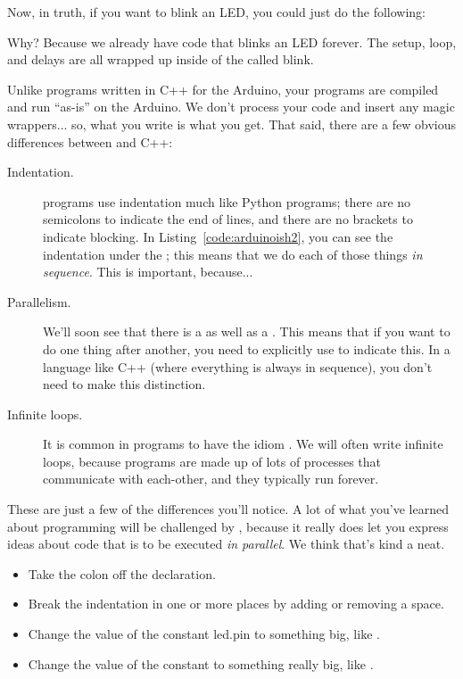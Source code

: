 

Now, in truth, if you want to blink an LED, you could just do the following:



Why? Because we already have code that blinks an LED forever. The setup, loop, and delays are all wrapped up inside of the \PROC called {\code blink}.

\discussion

Unlike programs written in C++ for the Arduino, your \occam programs are compiled and run ``as-is'' on the Arduino. We don't process your code and insert any magic wrappers... so, what you write is what you get. That said, there are a few obvious differences between \occam and C++:

\begin{description}
	\item[Indentation.] \occam programs use indentation much like Python programs; there are no semicolons to indicate the end of lines, and there are no brackets to indicate blocking. In Listing~\ref{code:arduinoish2}, you can see the indentation under the \SEQ; this means that we do each of those things \emph{in sequence}. This is important, because...
	\item[Parallelism.] We'll soon see that there is a \PAR as well as a \SEQ. This means that if you want to do one thing after another, you need to explicitly use \SEQ to indicate this. In a language like C++ (where everything is always in sequence), you don't need to make this distinction.
	\item[Infinite loops.] It is common in \occam programs to have the idiom \WHILETRUE. We will often write infinite loops, because \occam programs are made up of lots of processes that communicate with each-other, and they typically run forever.
\end{description}

These are just a few of the differences you'll notice. A lot of what you've learned about programming will be challenged by \occam, because it really does let you express ideas about code that is to be executed \emph{in parallel}. We think that's kind a neat.

\makingthingsbreak

\begin{itemize}
	\item Take the colon off the \VALINT declaration. 
	\item Break the indentation in one or more places by adding or removing a space.
	\item Change the value of the constant {\constant led.pin} to something big, like {}.
	\item Change the value of the constant {} to something really big, like {}.
\end{itemize}

